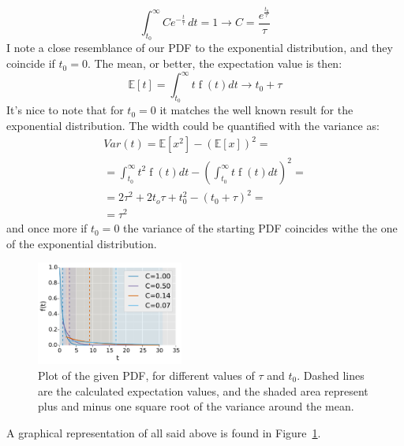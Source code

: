 \documentclass[twocolumn]{article}
\begin{document}
	\begin{equation}
		\int_{t_{{0}}}^{\infty} C e^{- \frac{t}{\tau}}\, dt = 1 \longrightarrow C =  \frac{
		e^{
		\frac{t_0}{\tau}
		}}
		{\tau}
	\end{equation}
	I note a close resemblance of our PDF to the exponential distribution, and they coincide if $t_0 = 0$. 
	The mean, or better, the expectation  value is then:
	\begin{equation}
	\mathbb{E} [t] = \int_{t_0}^{\infty} t \operatorname{f}{(t) d t } \longrightarrow  t_0 + \tau
	\end{equation}
	It's nice to note that for $t_0 = 0$ it matches the well known result for the exponential distribution.
	The width could be quantified with the variance as:
	\begin{multline}
		Var(t) = \mathbb{E}[x^2] - (\mathbb{E}[x])^2 = \\
		= 
		\int_{t_0}^{\infty} t^2 \operatorname{f}{(t) d t } 
		-(\int_{t_0}^{\infty} t \operatorname{f}{(t) d t })^2 = \\
		= 2 \tau ^ 2 + 2 t_o \tau +t_0 ^2  - ( t_0 + \tau ) ^ 2 = \\
		= \tau ^ 2
	\end{multline}
	and once more if $t_0 = 0 $ the variance of the starting PDF coincides withe the one of the exponential distribution. 
	\begin{figure}[htb]
		\begin{center}
			\includegraphics[width= 0.43\textwidth]{fig/graph.pdf}
		\end{center}
		\caption{Plot of the given PDF, for different values of $ \tau $ and $t_0 $. Dashed lines are the calculated expectation values, and the shaded area represent plus and minus one square root of the variance around the mean.}
		\label{fig:pdf}
	\end{figure}
	A graphical representation of all said above is found in Figure~\ref{fig:pdf}.
\end{document}

